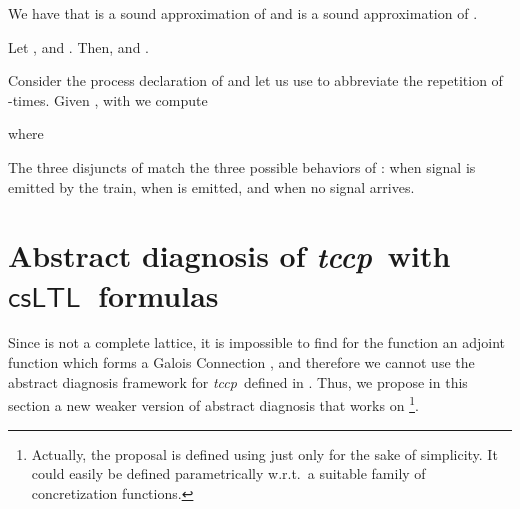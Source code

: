 \documentclass[american]{new_tlp}
\newcommand*{\csltl}[1][]{\ensuremath{\textsf{csLTL}_{#1}}}
\newcommand*{\progrule}{process declaration}
\newcommand*{\tccp}{\textit{tccp}}
\providecommand*{\wrt}  {w.r.t.}
\begin{document}
We have that  is a sound approximation of  and
 is a sound approximation of .
\begin{theorem}
    \label{th:FAa_FDd_soundness}
    Let ,  and .  Then,
     and
    .
\end{theorem}
\begin{example}\label{ex:TrainAbsSem}
    Consider the \progrule{}  of  and
    let us use  to abbreviate the repetition of 
    -times.
    Given , with  we compute
    
    where 
    {\small
    
    }The three disjuncts of  match the three possible
    behaviors of : when signal 
    is emitted by the train, when  is emitted, and when no
    signal arrives.
\end{example}



\section{Abstract diagnosis of \tccp\ with \csltl\ formulas}
\label{sec:abs-diag}

Since  is not a complete lattice, it is impossible to find for the
function  an adjoint function  which forms a Galois
Connection , and therefore we cannot use the
abstract diagnosis framework for \tccp\ defined in
\cite{CominiTV11absdiag}.  Thus, we propose in this section a new weaker
version of abstract diagnosis that works on  \footnote{Actually, the
proposal is defined using just  only for the sake of simplicity.
It could easily be defined parametrically \wrt\ a suitable family of
concretization functions.  }.
\end{document}
